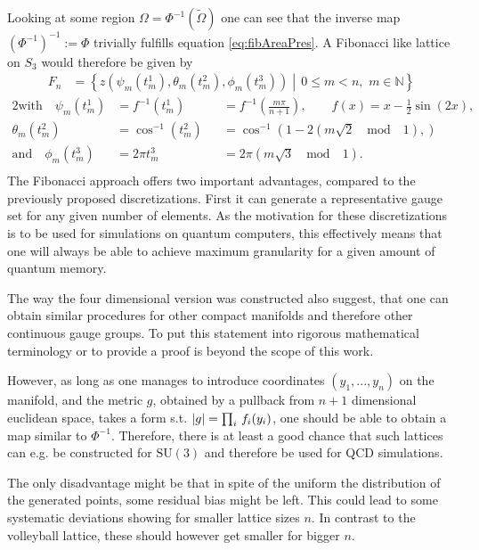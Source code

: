 Looking at some region $\Omega = \Phi^{-1} (\tilde{\Omega})$ one can see that the inverse map $(\Phi^{-1})^{-1} := \Phi$ trivially fulfills equation \ref{eq:fibAreaPres}. A Fibonacci like lattice on $S_3$ would therefore be given by
\begin{align*}
 F_n & = \left\{ z\left(\psi_m(t_m^1), \theta_m(t_m^2), \phi_m(t_m^3)\right)  \middle| \, 0 \le m < n, \, \, m \in \mathbb{N} \right\}
\end{align*}
\begin{alignat*}{2}
 \textrm{with} \quad \psi_m(t_m^1) & =  f^{-1} \left( t_m^1 \right)  &  & = f^{-1} \left( \frac{m\pi}{n+1}\right), \qquad f(x) = x - \frac{1}{2} \sin(2x) ,                                                                     \\
 \theta_m(t_m^2)                   & =  \cos^{-1}\left(t_m^2 \right) &  & =  \cos^{-1}\left(1-2(m\sqrt{2} \quad \mathrm{mod} \quad 1), \right)                                                                                  \\
 \textrm{and} \quad \phi_m (t_m^3) & =  2 \pi t^3_m                  &  & =                        2 \pi (m\sqrt{3} \quad \mathrm{mod} \quad 1)                                                                      \textrm{.} \\
\end{alignat*}
The Fibonacci approach offers two important advantages, compared to the previously proposed discretizations. First it can generate a representative gauge set for any given number of elements. As the motivation for these discretizations is to be used for simulations on quantum computers, this effectively means that one will always be able to achieve maximum granularity for a given amount of quantum memory.

The way the four dimensional version was constructed also suggest, that one can obtain similar procedures for other compact manifolds and therefore other continuous gauge groups. To put this statement into rigorous mathematical terminology or to provide a proof is beyond the scope of this work.

However, as long as one manages to introduce coordinates $(y_1, ..., y_n)$ on the manifold, and the metric $g$, obtained by a pullback from $n+1$ dimensional euclidean space, takes a form s.t. $\abs{g} = \prod_{i} \, f_i(y_i)$, one should be able to obtain a map similar to $\Phi^{-1}$. Therefore, there is at least a good chance that such lattices can e.g. be constructed for $\textrm{SU}(3)$ and therefore be used for QCD simulations.

The only disadvantage might be that in spite of the uniform the distribution of the generated points, some residual bias might be left. This could lead to some systematic deviations showing for smaller lattice sizes $n$. In contrast to the volleyball lattice, these should however get smaller for bigger $n$.
